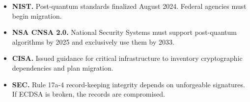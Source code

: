 \begin{itemize}[nosep]
  \item \textbf{NIST.}  Post-quantum standards finalized August 2024.
        Federal agencies must begin migration.
  \item \textbf{NSA CNSA 2.0.}  National Security Systems must support
        post-quantum algorithms by 2025 and exclusively use them by
        2033.
  \item \textbf{CISA.}  Issued guidance for critical infrastructure
        to inventory cryptographic dependencies and plan migration.
  \item \textbf{SEC.}  Rule 17a-4 record-keeping integrity depends
        on unforgeable signatures.  If ECDSA is broken, the records
        are compromised.
\end{itemize}


